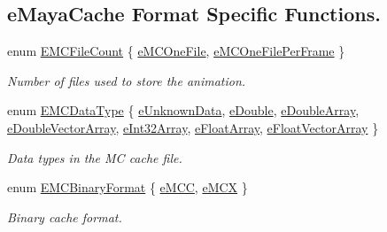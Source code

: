 \subsection*{e\+Maya\+Cache Format Specific Functions.}
\begin{DoxyCompactItemize}
\item 
enum \hyperlink{class_fbx_cache_afa5d133385fbd74b59e619c692a9cc36}{E\+M\+C\+File\+Count} \{ \hyperlink{class_fbx_cache_afa5d133385fbd74b59e619c692a9cc36accc8c423e169fc778550575dcbd79bcc}{e\+M\+C\+One\+File}, 
\hyperlink{class_fbx_cache_afa5d133385fbd74b59e619c692a9cc36a443acbc8142a8e4fa3eeb2e4c3fea327}{e\+M\+C\+One\+File\+Per\+Frame}
 \}\begin{DoxyCompactList}\small\item\em Number of files used to store the animation. \end{DoxyCompactList}
\item 
enum \hyperlink{class_fbx_cache_a80f82fa5f485ff6c46565ffb151998b3}{E\+M\+C\+Data\+Type} \{ \newline
\hyperlink{class_fbx_cache_a80f82fa5f485ff6c46565ffb151998b3a8b26bb731da16a3dbab5e918598872b8}{e\+Unknown\+Data}, 
\hyperlink{class_fbx_cache_a80f82fa5f485ff6c46565ffb151998b3a09e5d7151cf86e037c15b41af0d65e9d}{e\+Double}, 
\hyperlink{class_fbx_cache_a80f82fa5f485ff6c46565ffb151998b3ae39b52564972de1cdcfde5ee56c5d4f2}{e\+Double\+Array}, 
\hyperlink{class_fbx_cache_a80f82fa5f485ff6c46565ffb151998b3a650d3bda5d6886776bee42118f711cb3}{e\+Double\+Vector\+Array}, 
\newline
\hyperlink{class_fbx_cache_a80f82fa5f485ff6c46565ffb151998b3a0d06622346b6fc69daf634a1233217c7}{e\+Int32\+Array}, 
\hyperlink{class_fbx_cache_a80f82fa5f485ff6c46565ffb151998b3ae331b4603d8eea0b4917d022530f7d07}{e\+Float\+Array}, 
\hyperlink{class_fbx_cache_a80f82fa5f485ff6c46565ffb151998b3a67596d008f526a50a8f0d888d3f5dd6a}{e\+Float\+Vector\+Array}
 \}\begin{DoxyCompactList}\small\item\em Data types in the MC cache file. \end{DoxyCompactList}
\item 
enum \hyperlink{class_fbx_cache_af3afea849dd371f0b5ecbe135d34b829}{E\+M\+C\+Binary\+Format} \{ \hyperlink{class_fbx_cache_af3afea849dd371f0b5ecbe135d34b829af019bf2bf0ab0788673f38da0364570c}{e\+M\+CC}, 
\hyperlink{class_fbx_cache_af3afea849dd371f0b5ecbe135d34b829a9f9f7cbd770451b48ea473902dd04568}{e\+M\+CX}
 \}\begin{DoxyCompactList}\small\item\em Binary cache format. \end{DoxyCompactList}

\end{DoxyCompactItemize}
